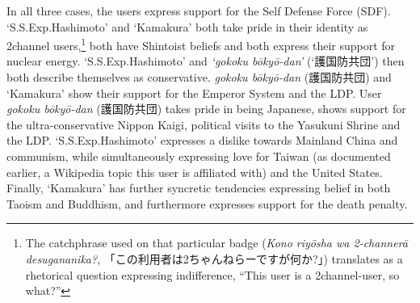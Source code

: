 \documentclass[10pt,british,A4paper,oneside]{memoir}
\begin{document}
In all three cases, the users express support for the Self Defense Force
(SDF). `S.S.Exp.Hashimoto' and `Kamakura' both take pride in their
identity as 2channel users,\footnote{The catchphrase used on that
  particular badge (\emph{Kono riyōsha wa 2-channerā desugananika?},
  「この利用者は2ちゃんねらーですが何か?」) translates as a rhetorical
  question expressing indifference, ``This user is a 2channel-user, so
  what?''} both have Shintoist beliefs and both express their support
for nuclear energy. `S.S.Exp.Hashimoto' and \emph{`gokoku bōkyō-dan'}
(`護国防共団') then both describe themselves as conservative.
\emph{gokoku bōkyō-dan} (護国防共団) and `Kamakura' show their support
for the Emperor System and the LDP. User \emph{gokoku bōkyō-dan}
(護国防共団) takes pride in being Japanese, shows support for the
ultra-conservative Nippon Kaigi, political visits to the Yasukuni Shrine
and the LDP. `S.S.Exp.Hashimoto' expresses a dislike towards Mainland
China and communism, while simultaneously expressing love for Taiwan (as
documented earlier, a Wikipedia topic this user is affiliated with) and
the United States. Finally, `Kamakura' has further syncretic tendencies
expressing belief in both Taoism and Buddhism, and furthermore expresses
support for the death penalty.
\end{document}

